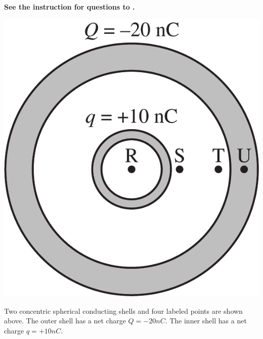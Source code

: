 
\textbf{See the instruction for questions  to .} 

\begin{center}
    \includegraphics[scale=0.25]{images/img-007-007.png}
\end{center}

Two concentric spherical conducting shells and four labeled points are shown above. The outer shell has a net charge $Q=-20 \unit{nC}$. The inner shell has a net charge $q=+10 \unit{nC}$.

